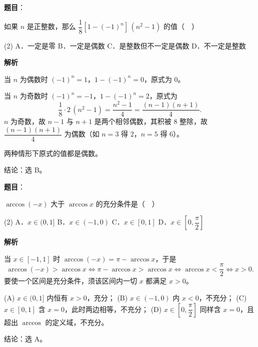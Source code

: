 \begin{answer}

\textbf{题目}：

如果 $n$ 是正整数，那么 $\dfrac18\left[1-(-1)^n\right]\,(n^2-1)$ 的值（　）

\begin{gkopts}(2)
\task A．一定是零
\task B．一定是偶数
\task C．是整数但不一定是偶数
\task D．不一定是整数
\end{gkopts}

\textbf{解析}

当 $n$ 为偶数时 $(-1)^n=1$，$1-(-1)^n=0$，原式为 $0$。

当 $n$ 为奇数时 $(-1)^n=-1$，$1-(-1)^n=2$，原式为
\nopagebreak[4]
\[
\frac18\cdot2\,(n^2-1)=\frac{n^2-1}{4}=\frac{(n-1)(n+1)}{4}.
\]
$n$ 为奇数，故 $n-1$ 与 $n+1$ 是两个相邻偶数，其积被 $8$ 整除，故 $\dfrac{(n-1)(n+1)}4$ 为偶数（如 $n=3$ 得 $2$，$n=5$ 得 $6$）。

两种情形下原式的值都是偶数。

结论：选 B。


\end{answer}
\begin{answer}

\textbf{题目}：

$\arccos(-x)$ 大于 $\arccos x$ 的充分条件是（　）

\begin{gkopts}(2)
\task A．$x\in(0,1]$
\task B．$x\in(-1,0)$
\task C．$x\in[0,1]$
\task D．$x\in\left[0,\dfrac\pi2\right]$
\end{gkopts}

\textbf{解析}

当 $x\in[-1,1]$ 时 $\arccos(-x)=\pi-\arccos x$，于是
\nopagebreak[4]
\[
\arccos(-x)>\arccos x\iff \pi-\arccos x>\arccos x\iff \arccos x<\frac\pi2\iff x>0.
\]
要使一个区间是充分条件，须该区间内一切 $x$ 都满足 $x>0$。

(A) $x\in(0,1]$ 内恒有 $x>0$，充分；
(B) $x\in(-1,0)$ 内 $x<0$，不充分；
(C) $x\in[0,1]$ 含 $x=0$，此时两边相等，不充分；
(D) $x\in\left[0,\dfrac\pi2\right]$ 同样含 $x=0$，且超出 $\arccos$ 的定义域，不充分。

结论：选 A。


\end{answer}

